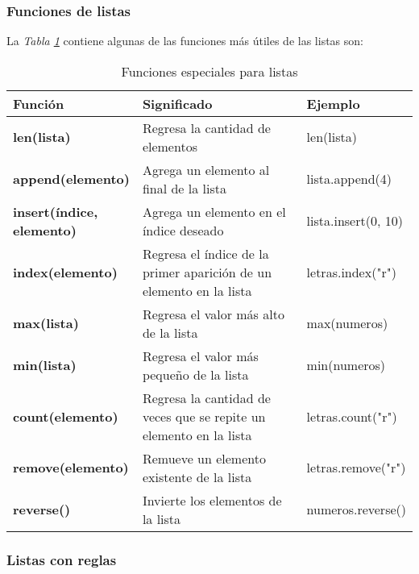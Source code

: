 \subsubsection{Funciones de listas}

La \textit{Tabla \ref{tab: 8}} contiene algunas de las funciones más útiles de las listas son:
\begin{table}[H]
    \begin{center}
        \caption{Funciones especiales para listas}
        \label{tab: 8}
        \begin{tabular}{m{4cm} m{5cm} m{4cm}}
            \hline
            \textbf{Función}&\textbf{Significado}&\textbf{Ejemplo} \\
            \hline
            \textbf{len(lista)}					& Regresa la cantidad de elementos										& len(lista) \\
            \textbf{append(elemento)}			& Agrega un elemento al final de la lista								& lista.append(4) \\
            \parbox{4cm}{\textbf{insert(índice,\\elemento)}}	& Agrega un elemento en el índice deseado 								& lista.insert(0, 10) \\
            \textbf{index(elemento)}			& \parbox{5cm}{\raggedright Regresa el índice de la primer aparición de un elemento en la lista}	& letras.index("r") \\
            \textbf{max(lista)}					& Regresa el valor más alto de la lista									& max(numeros) \\
            \textbf{min(lista)}					& \parbox{5cm}{\raggedright Regresa el valor más pequeño de la lista}								& min(numeros) \\
            \textbf{count(elemento)}			& Regresa la cantidad de veces que se repite un elemento en la lista	& letras.count("r") \\
            \textbf{remove(elemento)}			& Remueve un elemento existente de la lista								& letras.remove("r") \\
            \textbf{reverse()}					& Invierte los elementos de la lista										& numeros.reverse() \\
            \hline
        \end{tabular}
    \end{center}    
\end{table}


\subsubsection{Listas con reglas}

